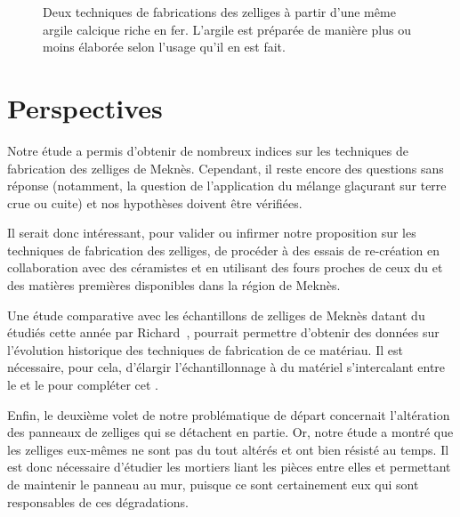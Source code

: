 \begin{figure}[p]
  \caption{Deux techniques de fabrications des zelliges à partir d'une 
           même argile calcique riche en fer. L'argile est préparée de 
           manière plus ou moins élaborée selon l'usage qu'il en est 
           fait.}
  \label{fig:protocole}
\end{figure}


\chapter{Perspectives}

Notre étude a permis d'obtenir de nombreux indices sur les techniques 
de fabrication des zelliges de Meknès. Cependant, il reste encore des 
questions sans réponse (notamment, la question de l'application du 
mélange glaçurant sur terre crue ou cuite) et nos hypothèses doivent 
être vérifiées.

Il serait donc intéressant, pour valider ou infirmer notre proposition 
sur les techniques de fabrication des zelliges, de procéder à des 
essais de re-création en collaboration avec des céramistes et en 
utilisant des fours proches de ceux du  et des matières 
premières disponibles dans la région de Meknès.

Une étude comparative avec les échantillons de zelliges de Meknès 
datant du  étudiés cette année par Richard~, 
pourrait permettre d'obtenir des données sur l'évolution historique 
des techniques de fabrication de ce matériau. Il est nécessaire, pour 
cela, d'élargir l’échantillonnage à du matériel s'intercalant entre 
le  et le  pour compléter cet 
.

Enfin, le deuxième volet de notre problématique de départ concernait 
l'altération des panneaux de zelliges qui se détachent en partie. Or, 
notre étude a montré que les zelliges eux-mêmes ne sont pas du tout 
altérés et ont bien résisté au temps. Il est donc nécessaire d'étudier 
les mortiers liant les pièces entre elles et permettant de maintenir 
le panneau au mur, puisque ce sont certainement eux qui sont 
responsables de ces dégradations.
